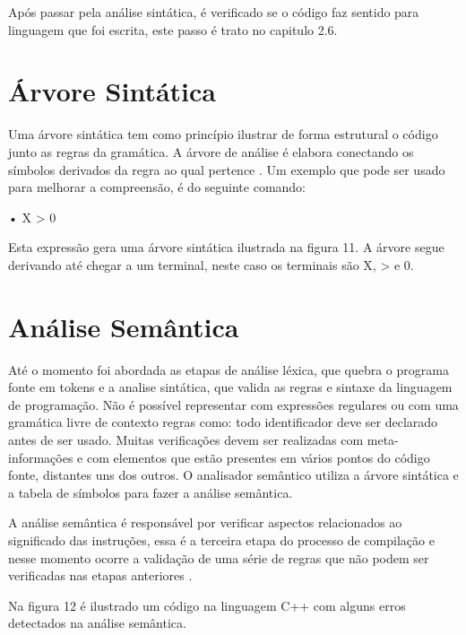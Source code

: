 \documentclass[12pt,oneside,a4paper,chapter=TITLE,section=TITLE,sumario=tradicional]{abntex2}
\begin{document}
Após passar pela análise sintática, é verificado se o código faz sentido para linguagem que foi escrita, este passo é trato no capitulo 2.6.

\section{Árvore Sintática}
\label{sec:arvoresintaticafuncadamentação}

Uma árvore sintática tem como princípio ilustrar de forma estrutural o código junto as regras da gramática. A árvore de análise é elabora conectando os símbolos derivados da regra ao qual pertence \cite{appel1998}. Um exemplo que pode ser usado para melhorar a compreensão, é do seguinte comando:

•	X > 0

Esta expressão gera uma árvore sintática ilustrada na figura 11. A árvore segue derivando até chegar a um terminal, neste caso os terminais são X, > e 0.

\begin{figure}[htb]
\end{figure}

\section{Análise Semântica}
\label{sec:analise-semantica}

Até o momento foi abordada as etapas de análise léxica, que quebra o programa fonte em tokens e a analise sintática, que valida as regras e sintaxe da linguagem de programação. Não é possível representar com expressões regulares ou com uma gramática livre de contexto regras como: todo identificador deve ser declarado antes de ser usado. Muitas verificações devem ser realizadas com meta-informações e com elementos que estão presentes em vários pontos do código fonte, distantes uns dos outros. O analisador semântico utiliza a árvore sintática e a tabela de símbolos para fazer a análise semântica. 

A análise semântica é responsável por verificar aspectos relacionados ao significado das instruções, essa é a terceira etapa do processo de compilação e nesse momento ocorre a validação de uma série de regras que não podem ser verificadas nas etapas anteriores \cite{maragon2015}.

Na figura 12 é ilustrado um código na linguagem C++ com alguns erros detectados na análise semântica.
\end{document}

